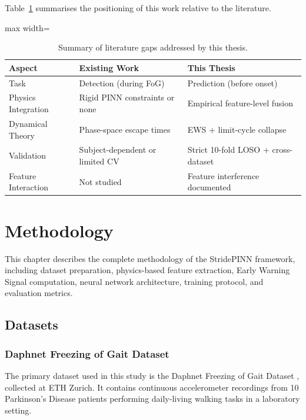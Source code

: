 \documentclass[12pt,a4paper,oneside]{report}
\numberwithin{equation}{chapter}
\numberwithin{figure}{chapter}
\numberwithin{table}{chapter}
\begin{document}
Table~\ref{tab:lit_summary} summarises the positioning of this work relative to the literature.

\begin{table}[ht]
\centering
\caption{Summary of literature gaps addressed by this thesis.}
\label{tab:lit_summary}
\renewcommand{\arraystretch}{1.3}
\begin{adjustbox}{max width=\textwidth}
\begin{tabular}{p{4cm}p{5cm}p{5cm}}
\toprule
\textbf{Aspect} & \textbf{Existing Work} & \textbf{This Thesis} \\
\midrule
Task & Detection (during FoG) & Prediction (before onset) \\
Physics Integration & Rigid PINN constraints or none & Empirical feature-level fusion \\
Dynamical Theory & Phase-space escape times & EWS + limit-cycle collapse \\
Validation & Subject-dependent or limited CV & Strict 10-fold LOSO + cross-dataset \\
Feature Interaction & Not studied & Feature interference documented \\
\bottomrule
\end{tabular}
\end{adjustbox}
\end{table}


\chapter{Methodology}

This chapter describes the complete methodology of the StridePINN framework, including dataset preparation, physics-based feature extraction, Early Warning Signal computation, neural network architecture, training protocol, and evaluation metrics.

\section{Datasets}

\subsection{Daphnet Freezing of Gait Dataset}

The primary dataset used in this study is the Daphnet Freezing of Gait Dataset \cite{bachlin2010, roggen2010}, collected at ETH Zurich. It contains continuous accelerometer recordings from 10 Parkinson's Disease patients performing daily-living walking tasks in a laboratory setting.
\end{document}
